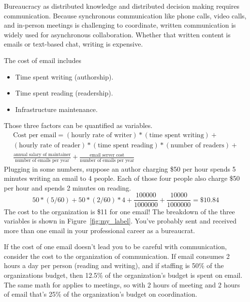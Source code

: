 Bureaucracy as distributed knowledge and distributed decision making requires communication. Because synchronous communication like phone calls, video calls, and in-person meetings is challenging to coordinate, written communication is widely used for asynchronous collaboration. Whether that written content is emails or text-based chat, writing is expensive.

The cost of email includes
\begin{itemize}
    \item Time spent writing (authorship).
    \item Time spent reading (readership).
    \item Infrastructure maintenance.
\end{itemize}

Those three factors can be quantified as variables. 
\begin{multline}
\text{Cost per email} = 
(\text{hourly rate of writer})*(\text{time spent writing}) +\\
(\text{hourly rate of reader})*(\text{time spent reading})*(\text{number of readers})+\\
\frac{\text{annual salary of maintainer}}{\text{number of emails per year}} + \frac{\text{email server cost}}{\text{number of emails per year}}
\end{multline}
Plugging in some numbers, suppose an author charging \$50 per hour spends 5 minutes writing an email to 4 people. Each of those four people also charge \$50 per hour and spends 2 minutes on reading. 
\begin{equation}
50*(5/60) + 50*(2/60)*4 + \frac{100000}{1000000} + \frac{10000}{1000000} = \$10.84
\label{eq:four_readers}
\end{equation}
The cost to the organization is \$11 for one email! The breakdown of the three variables is shown in Figure~\ref{fig:my_label}. You've probably sent and received more than one email in your professional career as a bureaucrat. 


If the cost of one email doesn't lead you to be careful with communication, consider the cost to the organization of communication. If email consumes 2 hours a day per person (reading and writing), and if staffing is 50\% of the organizations budget, then 
12.5\% of the organization's budget is spent on email. The same math for applies to meetings, so with 2 hours of meeting and 2 hours of email that's 25\% of the organization's budget on coordination.

